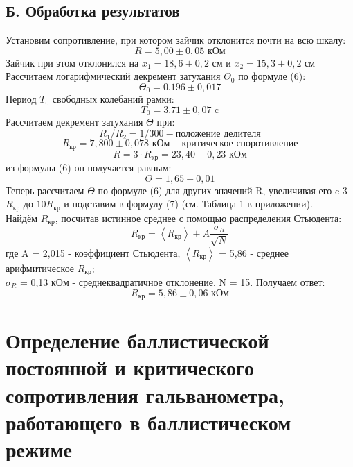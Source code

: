 \documentclass[a4paper,12pt]{article} %
\begin{document}
\subsection{Б. Обработка результатов}
Установим сопротивление, при котором зайчик отклонится почти на всю шкалу:
\[
R = 5,00 \pm 0,05 \text{ кОм}
\]
Зайчик при этом отклонился на $x_1 = 18,6 \pm 0,2 \text{ см}$ и $x_2 = 15,3 \pm 0,2 \text{ см}$
\\
\newline
Рассчитаем логарифмический декремент затухания $\Theta_0$ по формуле (6):
\[
\Theta_0 = 0.196 \pm 0,017
\]
Период $T_0$ свободных колебаний рамки:
\[
T_0 = 3.71 \pm 0,07 \text{ c}
\]
Рассчитаем декремент затухания $\Theta$ при:
\[
R_1/R_2 = 1/300 - \text{положение делителя}
\]
\[
R_\text{кр} = 7,800 \pm 0,078\text{ кОм} - \text{критическое споротивление}
\]
\[
R = 3 \cdot R_\text{кр} = 23,40 \pm 0,23\text{ кОм}
\]
из формулы (6) он получается равным:
\[
\Theta = 1,65 \pm 0,01
\]
Теперь рассчитаем $\Theta$ по формуле (6) для других значений R, увеличивая его c 3$R_\text{кр}$ до $10R_\text{кр}$ и подставим в формулу (7) (см. Таблица 1 в приложении).
\\
Найдём $R_\text{кр}$, посчитав истинное среднее с помощью распределения Стьюдента:
\begin{equation}
R_\text{кр} = \left<R_\text{кр}\right> \pm A \frac{\sigma_R}{\sqrt{N}}
\end{equation}
где A = 2,015 - коэффициент Стьюдента, $\left<R_\text{кр}\right>$ = 5,86 - среднее арифмитическое $R_\text{кр}$;
\\$\sigma_R$ = 0,13 кОм - среднеквадратичное отклонение. N = 15. Получаем ответ:
\[
R_\text{кр} = 5,86 \pm 0,06 \text{ кОм}
\]

\newpage

\section{Определение баллистической постоянной и критического сопротивления гальванометра, работающего в баллистическом режиме}
\end{document}
